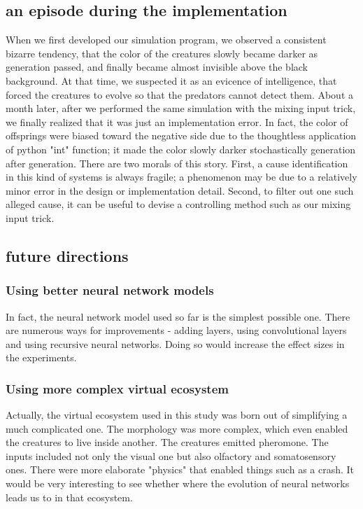 \documentclass{article}
\numberwithin{equation}{section}
\begin{document}
\subsection{an episode during the implementation}
When we first developed our simulation program, we observed a consistent bizarre tendency, that the color of the creatures slowly became darker as generation passed, and finally became almost invisible above the black background. At that time, we suspected it as an evicence of intelligence, that forced the creatures to evolve so that the predators cannot detect them. About a month later, after we performed the same simulation with the mixing input trick, we finally realized that it was just an implementation error. In fact, the color of offsprings were biased toward the negative side due to the thoughtless application of python "int" function; it made the color slowly darker stochastically generation after generation. There are two morals of this story. First, a cause identification in this kind of systems is always fragile; a phenomenon may be due to a relatively minor error in the design or implementation detail. Second, to filter out one such alleged cause, it can be useful to devise a controlling method such as our mixing input trick.   
\subsection{future directions}
\subsubsection{Using better neural network models}
In fact, the neural network model used so far is the simplest possible one. There are numerous ways for improvements - adding layers, using convolutional layers and using recursive neural networks. Doing so would increase the effect sizes in the experiments.

\subsubsection{Using more complex virtual ecosystem}
Actually, the virtual ecosystem used in this study was born out of simplifying a much complicated one. The morphology was more complex, which even enabled the creatures to live inside another. The creatures emitted pheromone. The inputs included not only the visual one but also olfactory and somatosensory ones. There were more elaborate "physics" that enabled things such as a crash. It would be very interesting to see whether where the evolution of neural networks leads us to in that ecosystem. 
\end{document}
